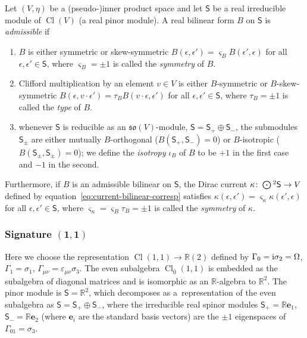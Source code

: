 \documentclass[10pt,a4paper]{amsart}
\numberwithin{equation}{section}
\newcommand{\fso}{\mathfrak{so}}
\newcommand{\RR}{\mathbb{R}}
\newcommand{\ssS}{\mathsf{S}}
\newcommand{\Odot}{\mathchoice{{\textstyle\bigodot}}{\bigodot}{\bigodot}{\bigodot}}
\newcommand{\be}{\boldsymbol{e}}
\newcommand{\1}{\mathbbm{1}}
\DeclareMathOperator{\Cl}{Cl}
\begin{document}
\begin{Definition}\label{def:admissible-bilinear}
	Let $(V,\eta)$ be a (pseudo-)inner product space and let $\ssS$ be a real irreducible module of $\Cl(V)$ (a real pinor module). A real bilinear form $B$ on $\ssS$ is \emph{admissible} if
	\begin{enumerate}\itemsep=0pt
		\item $B$ is either symmetric or skew-symmetric
	$B(\epsilon,\epsilon') = \varsigma_B B(\epsilon',\epsilon)
$
			for all $\epsilon,\epsilon'\in\ssS$, where $\varsigma_B=\pm 1$ is called the \emph{symmetry} of $B$.
		\item Clifford multiplication by an element $v\in V$ is either $B$-symmetric or $B$-skew-symmetric
$
				B(\epsilon,v\cdot \epsilon') = \tau_B B(v\cdot\epsilon,\epsilon')
$
			for all $\epsilon,\epsilon'\in\ssS$, where $\tau_B=\pm 1$ is called the \emph{type} of $B$.
		\item whenever $\ssS$ is reducible as an $\fso(V)$-module, $\ssS=\ssS_+\oplus \ssS_-$, the submodules $\ssS_\pm$ are either mutually $B$-orthogonal ($B(\ssS_+,\ssS_-)=0$) or $B$-isotropic ($B(\ssS_\pm,\ssS_\pm)=0$); we define the \emph{isotropy} $\iota_B$ of $B$ to be $+1$ in the first case and $-1$ in the second.%
	\end{enumerate}
	Furthermore, if $B$ is an admissible bilinear on $\ssS$, the Dirac current $\kappa\colon\Odot^2\ssS\to V$ defined by equation~\eqref{eq:current-bilinear-corresp} satisfies
$
		\kappa(\epsilon,\epsilon') = \varsigma_\kappa\kappa(\epsilon',\epsilon)
$
	for all $\epsilon,\epsilon'\in\ssS$, where $\varsigma_\kappa=\varsigma_B\tau_B=\pm 1$ is called the \emph{symmetry} of $\kappa$.
\end{Definition}

\subsubsection[Signature (1,1)]{Signature $\boldsymbol{(1,1)}$}

Here we choose the representation $\Cl(1,1)\to \RR(2)$ defined by
$\Gamma_0 = {\rm i}\sigma_2 = \Omega$,
$ \Gamma_1 = \sigma_1$,
$ \Gamma_{\mu\nu} = \varepsilon_{\mu\nu}\sigma_3$.
The even subalgebra $\Cl_{\bar 0}(1,1)$ is embedded as the subalgebra of diagonal matrices and is isomorphic as an $\RR$-algebra to $\RR^2$. The pinor module is $\ssS=\RR^2$, which decomposes as a~representation of the even subalgebra as $\ssS=\ssS_+\oplus \ssS_-$, where the irreducible real spinor modules $\ssS_+=\RR\be_1$, $\ssS_-=\RR\be_2$ (where $\be_i$ are the standard basis vectors) are the $\pm 1$ eigenspaces of $\Gamma_{01}=\sigma_3$.
\end{document}
